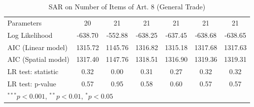 \begin{table}[!h]
\begin{center}
\begin{tabular}{l c c c c c c }
Parameters              & 20           & 21           & 21           & 21           & 21           & 21           \\
Log Likelihood          & -638.70      & -552.88      & -638.25      & -637.45      & -638.68      & -638.65      \\
AIC (Linear model)      & 1315.72      & 1145.76      & 1316.82      & 1315.18      & 1317.68      & 1317.63      \\
AIC (Spatial model)     & 1317.40      & 1147.76      & 1318.51      & 1316.90      & 1319.36      & 1319.31      \\
LR test: statistic      & 0.32         & 0.00         & 0.31         & 0.27         & 0.32         & 0.32         \\
LR test: p-value        & 0.57         & 0.95         & 0.58         & 0.60         & 0.57         & 0.57         \\
\bottomrule
\multicolumn{7}{l}{\scriptsize{$^{***}p<0.001$, $^{**}p<0.01$, $^*p<0.05$}}
\end{tabular}
\caption{SAR on Number of Items of Art. 8 (General Trade)}
\label{table:coefficients}
\end{center}
\end{table}
